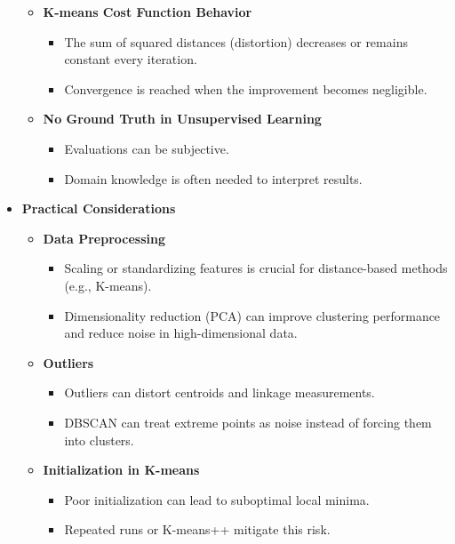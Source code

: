 \documentclass[10pt]{article}
\begin{document}
\begin{itemize}
\begin{itemize}
\begin{itemize}
        \end{itemize}
        \item \textbf{K-means Cost Function Behavior}
        \begin{itemize}
            \item The sum of squared distances (distortion) decreases or remains constant every iteration.
            \item Convergence is reached when the improvement becomes negligible.
        \end{itemize}
        \item \textbf{No Ground Truth in Unsupervised Learning}
        \begin{itemize}
            \item Evaluations can be subjective.
            \item Domain knowledge is often needed to interpret results.
        \end{itemize}
    \end{itemize}
    \item \textbf{Practical Considerations}
    \begin{itemize}
        \item \textbf{Data Preprocessing}
        \begin{itemize}
            \item Scaling or standardizing features is crucial for distance-based methods (e.g., K-means).
            \item Dimensionality reduction (PCA) can improve clustering performance and reduce noise in high-dimensional data.
        \end{itemize}
        \item \textbf{Outliers}
        \begin{itemize}
            \item Outliers can distort centroids and linkage measurements.
            \item DBSCAN can treat extreme points as noise instead of forcing them into clusters.
        \end{itemize}
        \item \textbf{Initialization in K-means}
        \begin{itemize}
            \item Poor initialization can lead to suboptimal local minima.
            \item Repeated runs or K-means++ mitigate this risk.
        \end{itemize}
    \end{itemize}
\end{itemize}
\end{document}
